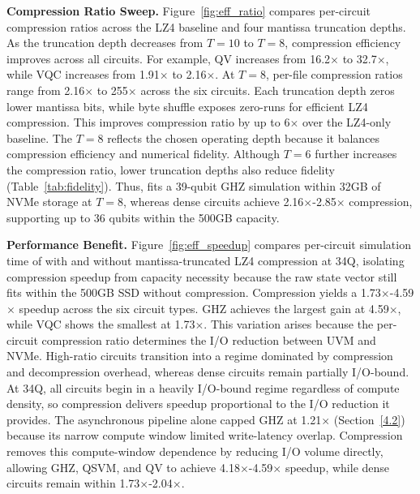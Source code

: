\noindent\textbf{Compression Ratio Sweep.} Figure~\ref{fig:eff_ratio} compares per-circuit compression ratios across the LZ4 baseline and four mantissa truncation depths. As the truncation depth decreases from $T=10$ to $T=8$, compression efficiency improves across all circuits. For example, QV increases from 16.2$\times$ to 32.7$\times$, while VQC increases from 1.91$\times$ to 2.16$\times$. At $T=8$, per-file compression ratios range from 2.16$\times$ to 255$\times$ across the six circuits. Each truncation depth zeros lower mantissa bits, while byte shuffle exposes zero-runs for efficient LZ4 compression. This improves compression ratio by up to 6$\times$ over the LZ4-only baseline. The $T=8$ reflects the chosen operating depth because it balances compression efficiency and numerical fidelity. Although $T=6$ further increases the compression ratio, lower truncation depths also reduce fidelity (Table~\ref{tab:fidelity}). Thus, \EdgeQuantum fits a 39-qubit GHZ simulation within 32GB of NVMe storage at $T=8$, whereas dense circuits achieve 2.16$\times$-2.85$\times$ compression, supporting up to 36 qubits within the 500GB capacity.

\noindent\textbf{Performance Benefit.} Figure~\ref{fig:eff_speedup} compares per-circuit simulation time of \EdgeQuantum with and without mantissa-truncated LZ4 compression at 34Q, isolating compression speedup from capacity necessity because the raw state vector still fits within the 500GB SSD without compression. Compression yields a 1.73$\times$-4.59$\times$ speedup across the six circuit types. GHZ achieves the largest gain at 4.59$\times$, while VQC shows the smallest at 1.73$\times$. This variation arises because the per-circuit compression ratio determines the I/O reduction between UVM and NVMe. High-ratio circuits transition into a regime dominated by compression and decompression overhead, whereas dense circuits remain partially I/O-bound. At 34Q, all circuits begin in a heavily I/O-bound regime regardless of compute density, so compression delivers speedup proportional to the I/O reduction it provides. The asynchronous pipeline alone capped GHZ at 1.21$\times$ (Section~\ref{4.2}) because its narrow compute window limited write-latency overlap. Compression removes this compute-window dependence by reducing I/O volume directly, allowing GHZ, QSVM, and QV to achieve 4.18$\times$-4.59$\times$ speedup, while dense circuits remain within 1.73$\times$-2.04$\times$.

